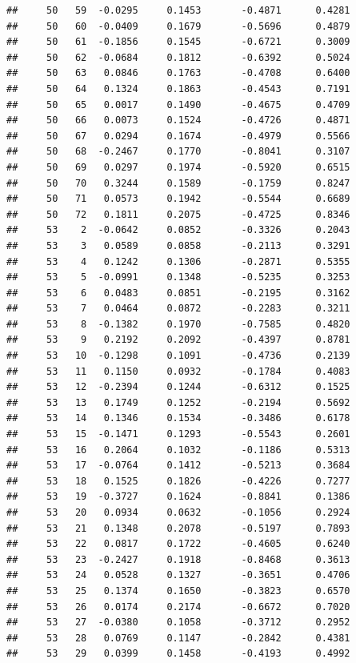 \documentclass[
]{article}
\begin{document}
\begin{verbatim}
##     50   59  -0.0295     0.1453       -0.4871      0.4281  
##     50   60  -0.0409     0.1679       -0.5696      0.4879  
##     50   61  -0.1856     0.1545       -0.6721      0.3009  
##     50   62  -0.0684     0.1812       -0.6392      0.5024  
##     50   63   0.0846     0.1763       -0.4708      0.6400  
##     50   64   0.1324     0.1863       -0.4543      0.7191  
##     50   65   0.0017     0.1490       -0.4675      0.4709  
##     50   66   0.0073     0.1524       -0.4726      0.4871  
##     50   67   0.0294     0.1674       -0.4979      0.5566  
##     50   68  -0.2467     0.1770       -0.8041      0.3107  
##     50   69   0.0297     0.1974       -0.5920      0.6515  
##     50   70   0.3244     0.1589       -0.1759      0.8247  
##     50   71   0.0573     0.1942       -0.5544      0.6689  
##     50   72   0.1811     0.2075       -0.4725      0.8346  
##     53    2  -0.0642     0.0852       -0.3326      0.2043  
##     53    3   0.0589     0.0858       -0.2113      0.3291  
##     53    4   0.1242     0.1306       -0.2871      0.5355  
##     53    5  -0.0991     0.1348       -0.5235      0.3253  
##     53    6   0.0483     0.0851       -0.2195      0.3162  
##     53    7   0.0464     0.0872       -0.2283      0.3211  
##     53    8  -0.1382     0.1970       -0.7585      0.4820  
##     53    9   0.2192     0.2092       -0.4397      0.8781  
##     53   10  -0.1298     0.1091       -0.4736      0.2139  
##     53   11   0.1150     0.0932       -0.1784      0.4083  
##     53   12  -0.2394     0.1244       -0.6312      0.1525  
##     53   13   0.1749     0.1252       -0.2194      0.5692  
##     53   14   0.1346     0.1534       -0.3486      0.6178  
##     53   15  -0.1471     0.1293       -0.5543      0.2601  
##     53   16   0.2064     0.1032       -0.1186      0.5313  
##     53   17  -0.0764     0.1412       -0.5213      0.3684  
##     53   18   0.1525     0.1826       -0.4226      0.7277  
##     53   19  -0.3727     0.1624       -0.8841      0.1386  
##     53   20   0.0934     0.0632       -0.1056      0.2924  
##     53   21   0.1348     0.2078       -0.5197      0.7893  
##     53   22   0.0817     0.1722       -0.4605      0.6240  
##     53   23  -0.2427     0.1918       -0.8468      0.3613  
##     53   24   0.0528     0.1327       -0.3651      0.4706  
##     53   25   0.1374     0.1650       -0.3823      0.6570  
##     53   26   0.0174     0.2174       -0.6672      0.7020  
##     53   27  -0.0380     0.1058       -0.3712      0.2952  
##     53   28   0.0769     0.1147       -0.2842      0.4381  
##     53   29   0.0399     0.1458       -0.4193      0.4992  

\end{verbatim}
\end{document}
